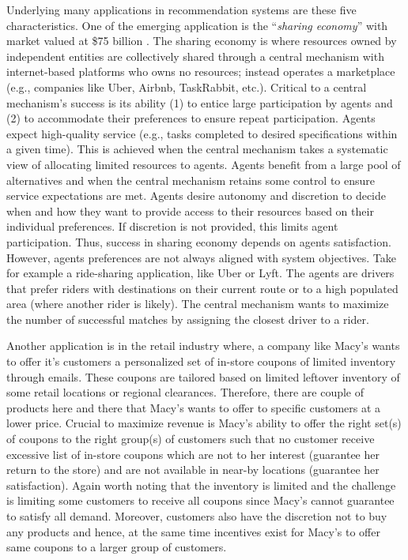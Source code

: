 \documentclass[11pt, letterpaper]{article}
\begin{document}
Underlying many applications in recommendation systems are these five characteristics. One of the emerging application is the ``\emph{sharing economy}''  with market valued at \$75 billion \cite{allen2015sharing}. The sharing economy is where resources owned by independent entities are collectively shared through a central mechanism with internet-based platforms who owns no resources; instead operates a marketplace (e.g., companies like Uber, Airbnb, TaskRabbit, etc.). Critical to a central mechanism's success is its ability (1) to entice large participation by agents and (2) to accommodate their preferences to ensure repeat participation. Agents expect high-quality service (e.g., tasks completed to desired specifications within a given time). This is achieved when the central mechanism takes a systematic view of allocating  limited resources to agents.  Agents benefit from a large pool of alternatives and when the central mechanism retains some control to ensure service expectations are met.  Agents desire autonomy and discretion to decide when and how they want to provide access to their resources  based on their individual preferences. If discretion is not provided, this limits agent participation.  Thus, success in sharing economy depends on agents satisfaction.  However, agents preferences are not always aligned with system objectives. Take for example a ride-sharing application, like Uber or Lyft.  The agents are drivers that prefer riders with destinations on their current route or to a high populated area (where another rider is likely). The central mechanism wants to maximize the number of successful matches by assigning the closest driver to a rider.   

Another application is in the retail industry where, a company like Macy's  wants to offer it's customers a personalized set of in-store coupons of limited inventory through emails. These coupons are tailored based on limited leftover %
inventory of some retail locations or regional clearances. Therefore, there are couple of products here and there that Macy's wants to offer to specific customers at a lower price. 
Crucial to maximize revenue is Macy's ability to offer the right set(s) of coupons to the right group(s) of customers such that no customer receive excessive list of in-store coupons which are not to her interest (guarantee her return to the store) and are not available in near-by locations (guarantee her satisfaction). Again worth noting that the inventory is limited and the challenge is limiting some customers to receive all coupons since Macy's cannot guarantee to satisfy all demand. Moreover, customers also have the discretion not to buy any products and hence, at the same time incentives exist for Macy's to offer same coupons to a larger group of customers. 
\end{document}
